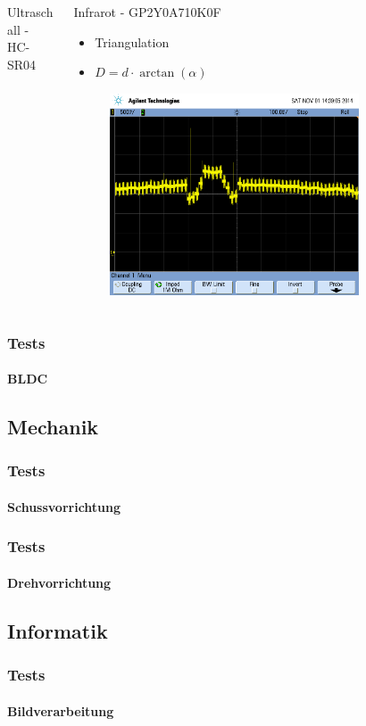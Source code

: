 \begin{frame}
\begin{columns}
\begin{column}{0.5\textwidth}
\begin{block}{Ultraschall - HC-SR04}
            \end{block}
        \end{column}
        \pause
        \begin{column}{0.5\textwidth}
            \begin{block}{Infrarot - GP2Y0A710K0F}
                \begin{itemize}
                    \item Triangulation
                    \item $D = d \cdot \arctan(\alpha)$
                \end{itemize}
                \pause
                \begin{figure}
                    \includegraphics[width=0.8\textwidth]{../doc/fig/scope_80.png}
                \end{figure}
            \end{block}
        \end{column}
    \end{columns}
\end{frame}

\begin{frame}
    \frametitle{Tests}
    \framesubtitle{BLDC}
\end{frame}

\subsection{Mechanik}
\begin{frame}
    \frametitle{Tests}
    \framesubtitle{Schussvorrichtung}
\end{frame}
\begin{frame}
    \frametitle{Tests}
    \framesubtitle{Drehvorrichtung}
\end{frame}

\subsection{Informatik}
\begin{frame}
    \frametitle{Tests}
    \framesubtitle{Bildverarbeitung}
\end{frame}

